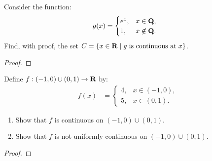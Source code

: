 \documentclass[11pt,twoside,openany]{memoir}
\begin{document}
\newpage
\fancyhead[L]{\scalebox{0.9}{Continuity}}
\fancyhead[R]{\scalebox{0.9}{Appeared on: W21}}
\begin{problem}
    Consider the function:
        \begin{equation*}
        \begin{split}
            g(x)
            & = \begin{cases}
                e^x,& x \in \bfQ,\\
                1,&  x \not\in \bfQ.
            \end{cases}
        \end{split}
        \end{equation*}
    Find, with proof, the set $C = \{x \in \bfR \mid g \h3\text{is continuous at}\h3 x \}$.
\end{problem}
\begin{proof}
\end{proof}

\newpage
\fancyhead[L]{\scalebox{0.9}{Continuity}}
\fancyhead[R]{\scalebox{0.9}{Appeared on: F20}}
\begin{problem}
    Define $f:(-1,0) \cup (0,1) \rightarrow \bfR$ by:
    \begin{equation*}
        \begin{split}
            f(x)
            & = \begin{cases}
                4,& x \in (-1,0),\\
                5,&  x \in (0,1).
            \end{cases}
        \end{split}
        \end{equation*}
    \begin{enumerate}[label = (\arabic*)]
        \item Show that $f$ is continuous on $(-1,0) \cup (0,1)$.
        \item Show that $f$ is not uniformly continuous on $(-1,0) \cup (0,1)$.
    \end{enumerate}
\end{problem}
\begin{proof}
\end{proof}
\end{document}
